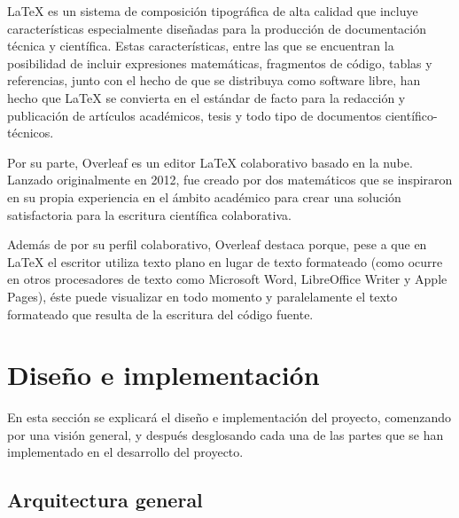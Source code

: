 \documentclass[a4paper, 12pt]{book}
\begin{document}
LaTeX es un sistema de composición tipográfica de alta calidad que incluye características especialmente diseñadas para la producción de documentación técnica y científica. Estas características, entre las que se encuentran la posibilidad de incluir expresiones matemáticas, fragmentos de código, tablas y referencias, junto con el hecho de que se distribuya como software libre, han hecho que LaTeX se convierta en el estándar de facto para la redacción y publicación de artículos académicos, tesis y todo tipo de documentos científico-técnicos. 

Por su parte, Overleaf es un editor LaTeX colaborativo basado en la nube. Lanzado originalmente en 2012, fue creado por dos matemáticos que se inspiraron en su propia experiencia en el ámbito académico para crear una solución satisfactoria para la escritura científica colaborativa.

Además de por su perfil colaborativo, Overleaf destaca porque, pese a que en LaTeX el escritor utiliza texto plano en lugar de texto formateado (como ocurre en otros procesadores de texto como Microsoft Word, LibreOffice Writer y Apple Pages), éste puede visualizar en todo momento y paralelamente el texto formateado que resulta de la escritura del código fuente.

\clearpage


\chapter{Diseño e implementación}
\label{chap:diseño}

En esta sección se explicará el diseño e implementación del proyecto, comenzando por una visión general, y después desglosando cada una de las partes que se han implementado en el desarrollo del proyecto.

\section{Arquitectura general} 
\label{sec:arquitectura}
\end{document}
